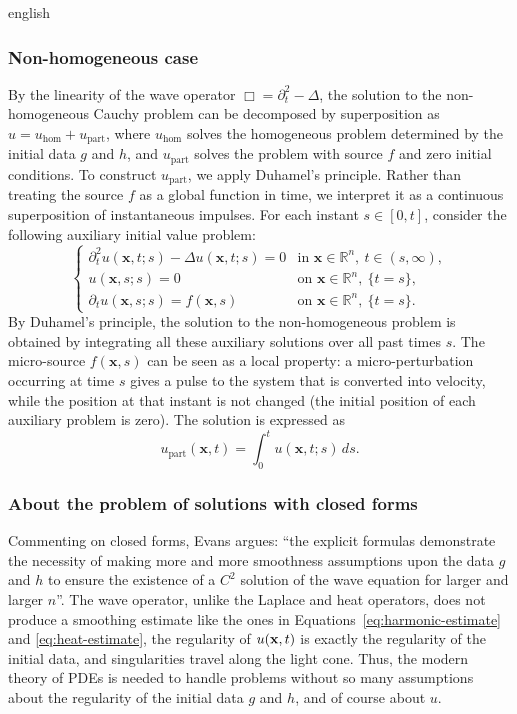\begin{hyphenrules}{english}
\subsubsection{Non-homogeneous case}
By the linearity of the wave operator $\Box=\partial_t^2-\Delta$, the solution to the non-homogeneous
Cauchy problem can be decomposed by superposition as $u=u_{\mathrm{hom}}+u_{\mathrm{part}}$, where
$u_{\mathrm{hom}}$ solves the homogeneous problem determined by the initial data $g$ and $h$, and
$u_{\mathrm{part}}$ solves the problem with source $f$ and zero initial conditions. To construct
$u_{\mathrm{part}}$, we apply Duhamel's principle. Rather than treating the source $f$ as a global
function in time, we interpret it as a continuous superposition of instantaneous impulses. For each
instant $s\in[0,t]$, consider the following auxiliary initial value problem:
\begin{equation}
  \begin{cases}
    \partial_t^2u(\mathbf{x},t;s)-\Delta u(\mathbf{x},t;s)=0 & \text{in } \mathbf{x}\in\mathbb{R}^n,\ t\in(s,\infty),\\
    u(\mathbf{x},s;s)=0 & \text{on } \mathbf{x}\in\mathbb{R}^n,\ \{t=s\},\\
    \partial_t u(\mathbf{x},s;s)=f(\mathbf{x},s) & \text{on } \mathbf{x}\in\mathbb{R}^n,\ \{t=s\}.
  \end{cases}
  \label{eq:wave-duhamel-aux}
\end{equation}
By Duhamel's principle, the solution to the non-homogeneous problem is obtained by integrating all
these auxiliary solutions over all past times $s$. The micro-source $f(\mathbf{x},s)$ can be seen as a local
property: a micro-perturbation occurring at time $s$ gives a pulse to the system that is converted into
velocity, while the position at that instant is not changed (the initial position of each auxiliary
problem is zero). The solution is expressed as
\begin{equation}
  u_{\mathrm{part}}(\mathbf{x},t)=\int_0^t u(\mathbf{x},t;s)\,d s.
  \label{eq:wave-duhamel}
\end{equation}

\subsubsection{About the problem of solutions with closed forms}
Commenting on closed forms, Evans \cite[p.~82]{evans2010} argues: ``the explicit formulas demonstrate the necessity of making more and more smoothness assumptions upon the data $g$ and $h$ to ensure the existence of a $C^2$ solution of the wave equation for larger and larger $n$''. The wave operator, unlike the Laplace
and heat operators, does not produce a smoothing estimate like the ones in
Equations~\eqref{eq:harmonic-estimate} and \eqref{eq:heat-estimate}, the regularity of $u(\mathbf{x},t)$ is exactly the regularity
of the initial data, and singularities travel along the light cone. Thus, the modern theory of PDEs is needed
to handle problems without so many assumptions about the regularity of the initial data $g$ and $h$,
and of course about $u$.


\end{hyphenrules}
